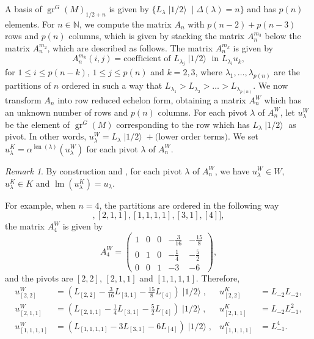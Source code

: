 \documentclass[a4paper, 12pt, reqno]{amsart}
\theoremstyle{remark}
\newtheorem{remark}[theorem]{Remark}
\numberwithin{equation}{subsection}
\DeclareMathOperator{\gr}{gr}
\DeclareMathOperator{\lm}{lm}
\DeclareMathOperator{\len}{len}
\DeclareMathOperator{\vachalf}{|1/2\rangle}
\begin{document}
A basis of $\gr^G(M)_{1/2 + n}$ is given by $\{L_{\lambda}\vachalf \mid \Delta(\lambda) = n\}$ and has $p(n)$ elements.
For $n \in \mathbb{N}$, we compute the matrix $A_n$ with $p(n - 2) + p(n - 3)$ rows and $p(n)$ columns, which is given by stacking the matrix $A^{m_3}_n$ below the matrix $A^{m_2}_n$, which are described as follows.
The matrix $A^{m_k}_n$ is given by
\begin{equation*}
  A^{m_k}_n(i, j) = \text{coefficient of }L_{\lambda_j}\vachalf\text{ in }L_{\lambda_i}u_k,
\end{equation*}
for $1 \le i \le p(n - k)$, $1 \le j \le p(n)$ and $k = 2, 3$, where $\lambda_1, \dots, \lambda_{p(n)}$ are the partitions of $n$ ordered in such a way that $L_{\lambda_1} > L_{\lambda_2} > \dots > L_{\lambda_{p(n)}}$.
We now transform $A_n$ into row reduced echelon form, obtaining a matrix $A^W_n$ which has an unknown number of rows and $p(n)$ columns.
For each pivot $\lambda$ of $A^W_n$, let $u^W_{\lambda}$ be the element of $\gr^G(M)$ corresponding to the row which has $L_{\lambda}\vachalf$ as pivot.
In other words, $u^W_{\lambda} = L_{\lambda}\vachalf + \text{(lower order terms)}$.
We set $u^K_{\lambda} = \alpha^{\len(\lambda)}(u^W_{\lambda})$ for each pivot $\lambda$ of $A^W_n$.

\begin{remark}
  \label{rmk:44}
  By construction and , for each pivot $\lambda$ of $A^W_n$, we have $u^W_{\lambda} \in W$, $u^K_{\lambda} \in K$ and $\lm(u^K_{\lambda}) = u_{\lambda}$.
\end{remark}

For example, when $n = 4$, the partitions are ordered in the following way
\begin{equation*}
  [[2, 2], [2, 1, 1], [1, 1, 1, 1], [3, 1], [4]],
\end{equation*}
the matrix $A^W_4$ is given by
\begin{equation*}
  A^W_4=
  \begin{pmatrix}
    1 & 0 & 0 & -\frac{3}{16} & -\frac{15}{8} \\
    0 & 1 & 0 & -\frac{1}{4} & -\frac{5}{2} \\
    0 & 0 & 1 & -3 & -6
  \end{pmatrix},
\end{equation*}
and the pivots are $[2, 2]$, $[2, 1, 1]$ and $[1, 1, 1, 1]$.
Therefore,
\begin{align*}
  u^W_{[2, 2]} &= (L_{[2, 2]} - \tfrac{3}{16}L_{[3, 1]} - \tfrac{15}{8}L_{[4]})\vachalf, &u^K_{[2, 2]} &= L_{-2}L_{-2}, \\
  u^W_{[2, 1, 1]} &= (L_{[2, 1, 1]} - \tfrac{1}{4}L_{[3, 1]} - \tfrac{5}{2}L_{[4]})\vachalf, &u^K_{[2, 1, 1]} &= L_{-2}L_{-1}^2, \\
  u^W_{[1, 1, 1, 1]} &= (L_{[1, 1, 1, 1]} - 3L_{[3, 1]} - 6L_{[4]})\vachalf, &u^K_{[1, 1, 1, 1]} &= L_{-1}^4.
\end{align*}
\end{document}
